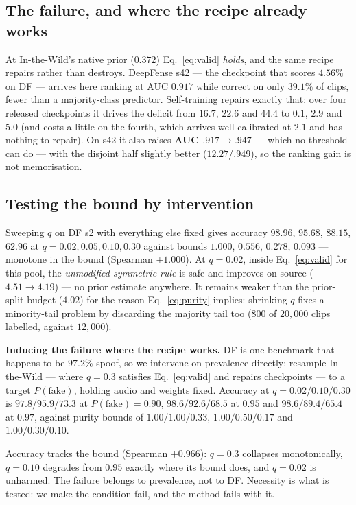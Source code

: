 \documentclass[conference]{IEEEtran}
\begin{document}
\subsection{The failure, and where the recipe already works}
At In-the-Wild's native prior ($0.372$) Eq.~\eqref{eq:valid} \emph{holds}, and
the same recipe repairs rather than destroys. DeepFense s42 --- the checkpoint
that scores $4.56\%$ on DF --- arrives here ranking at AUC $0.917$ while correct
on only $39.1\%$ of clips, fewer than a majority-class predictor. Self-training
repairs exactly that: over four released checkpoints it drives the deficit from
$16.7$, $22.6$ and $44.4$ to $0.1$, $2.9$ and $5.0$ (and costs a little on the
fourth, which arrives well-calibrated at $2.1$ and has nothing to repair). On
s42 it also raises \textbf{AUC $.917\!\to\!.947$} --- which no threshold can do
--- with the disjoint half slightly better ($12.27$/$.949$), so the ranking gain
is not memorisation.

\subsection{Testing the bound by intervention}
Sweeping $q$ on DF s2 with everything else fixed gives accuracy $98.96$,
$95.68$, $88.15$, $62.96$ at $q{=}0.02,0.05,0.10,0.30$ against bounds $1.000$,
$0.556$, $0.278$, $0.093$ --- monotone in the bound (Spearman $+1.000$). At
$q{=}0.02$,
inside Eq.~\eqref{eq:valid} for this pool, the \emph{unmodified symmetric rule}
is safe and improves on source ($4.51\!\to\!4.19$) --- no prior estimate anywhere.
It remains weaker than the prior-split budget ($4.02$) for the reason
Eq.~\eqref{eq:purity} implies: shrinking $q$ fixes a minority-tail problem by
discarding the majority tail too ($800$ of $20{,}000$ clips labelled, against
$12{,}000$).

\textbf{Inducing the failure where the recipe works.} DF is one benchmark that
happens to be $97.2\%$ spoof, so we intervene on prevalence directly: resample
In-the-Wild --- where $q{=}0.3$ satisfies Eq.~\eqref{eq:valid} and repairs
checkpoints --- to a target $P(\mathrm{fake})$, holding audio and weights fixed. Accuracy at
$q{=}0.02/0.10/0.30$ is $97.8/95.9/73.3$ at $P(\mathrm{fake}){=}0.90$,
$98.6/92.6/68.5$ at $0.95$ and $98.6/89.4/65.4$ at $0.97$, against purity bounds
of $1.00/1.00/0.33$, $1.00/0.50/0.17$ and $1.00/0.30/0.10$.

\noindent Accuracy tracks the bound (Spearman $+0.966$): $q{=}0.3$ collapses
monotonically, $q{=}0.10$ degrades from $0.95$ exactly where its bound does, and
$q{=}0.02$ is unharmed. The failure belongs to prevalence, not to DF.
Necessity is what is tested: we make the condition fail, and the method fails
with it.
\end{document}
